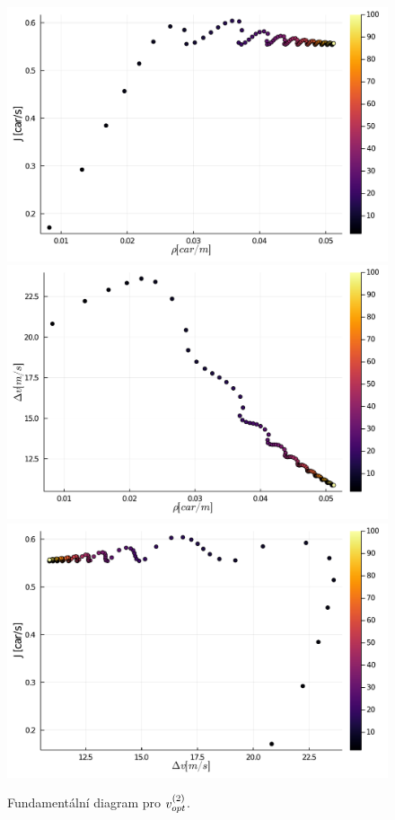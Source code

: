 \documentclass[a4paper, 12pt, fleqn]{article}
\begin{document}
\begin{figure}
	\centering
	\begin{minipage}[c]{0.7\textwidth}
		\centering
		\vspace*{\fill}
		\includegraphics[width=\textwidth]{images/FD_RJ_vopt2.pdf}
		\includegraphics[width=\textwidth]{images/FD_RV_vopt2.pdf}
		\includegraphics[width=\textwidth]{images/FD_VJ_vopt2.pdf}
	\end{minipage}
	\caption{Fundamentální diagram pro $v_{opt}^{(2)}$.}
	\label{Obr: FD vopt2}
\end{figure}
\end{document}
